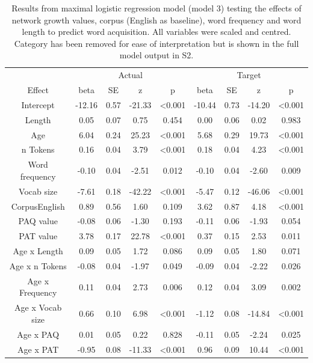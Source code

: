 \documentclass[
  man,mask,floatsintext]{apa6}
\begin{document}
\begin{longtable}[t]{ccccccccc}
\caption{\label{tab:table-data-summary}Results from maximal logistic regression model (model 3) testing the effects of network growth values, corpus (English as baseline), word frequency and word length to predict word acquisition. All variables were scaled and centred. Category has been removed for ease of interpretation but is shown in the full model output in S2.}\\
\toprule
\multicolumn{1}{c}{ } & \multicolumn{4}{c}{Actual} & \multicolumn{4}{c}{Target} \\
\cmidrule(l{3pt}r{3pt}){2-5} \cmidrule(l{3pt}r{3pt}){6-9}
Effect & beta & SE & z & p & beta & SE & z & p\\
\midrule
Intercept & -12.16 & 0.57 & -21.33 & <0.001 & -10.44 & 0.73 & -14.20 & <0.001\\
Length & 0.05 & 0.07 & 0.75 & 0.454 & 0.00 & 0.06 & 0.02 & 0.983\\
Age & 6.04 & 0.24 & 25.23 & <0.001 & 5.68 & 0.29 & 19.73 & <0.001\\
n Tokens & 0.16 & 0.04 & 3.79 & <0.001 & 0.18 & 0.04 & 4.23 & <0.001\\
Word frequency & -0.10 & 0.04 & -2.51 & 0.012 & -0.10 & 0.04 & -2.60 & 0.009\\
\addlinespace
Vocab size & -7.61 & 0.18 & -42.22 & <0.001 & -5.47 & 0.12 & -46.06 & <0.001\\
CorpusEnglish & 0.89 & 0.56 & 1.60 & 0.109 & 3.62 & 0.87 & 4.18 & <0.001\\
PAQ value & -0.08 & 0.06 & -1.30 & 0.193 & -0.11 & 0.06 & -1.93 & 0.054\\
PAT value & 3.78 & 0.17 & 22.78 & <0.001 & 0.37 & 0.15 & 2.53 & 0.011\\
Age x Length & 0.09 & 0.05 & 1.72 & 0.086 & 0.09 & 0.05 & 1.80 & 0.071\\
\addlinespace
Age x n Tokens & -0.08 & 0.04 & -1.97 & 0.049 & -0.09 & 0.04 & -2.22 & 0.026\\
Age x Frequency & 0.11 & 0.04 & 2.73 & 0.006 & 0.12 & 0.04 & 3.09 & 0.002\\
Age x Vocab size & 0.66 & 0.10 & 6.98 & <0.001 & -1.12 & 0.08 & -14.84 & <0.001\\
Age x PAQ & 0.01 & 0.05 & 0.22 & 0.828 & -0.11 & 0.05 & -2.24 & 0.025\\
Age x PAT & -0.95 & 0.08 & -11.33 & <0.001 & 0.96 & 0.09 & 10.44 & <0.001\\
\bottomrule
\end{longtable}
\end{document}
